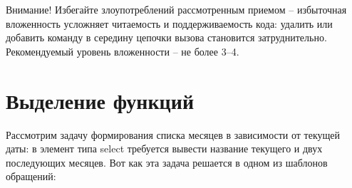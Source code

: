 \documentclass[../index.tex]{subfiles}
\begin{document}
Внимание! 
Избегайте злоупотреблений рассмотренным приемом -- избыточная вложенность усложняет читаемость и поддерживаемость кода: удалить или добавить команду в середину цепочки вызова становится затруднительно. Рекомендуемый уровень вложенности -- не более 3--4.
    
\section{Выделение функций}
    
Рассмотрим задачу формирования списка месяцев в зависимости от текущей даты: в элемент типа select требуется вывести название текущего и двух последующих месяцев. Вот как эта задача решается в одном из шаблонов обращений:

\begin{verbatim}


\end{verbatim}
\end{document}
